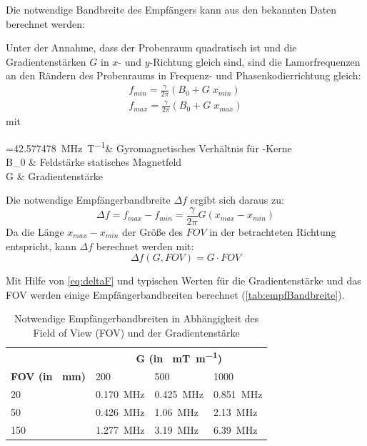 Die notwendige Bandbreite des Empfängers kann aus den bekannten Daten berechnet werden:

Unter der Annahme, dass der Probenraum quadratisch ist und die Gradientenstärken $G$ in $x$- und $y$-Richtung gleich sind, sind die Lamorfrequenzen an den Rändern des Probenraums in Frequenz- und Phasenkodierrichtung gleich:
\begin{subequations}
	\begin{align}
	f_{min}=\frac{\gamma}{2\pi} (B_0+G\; x_{min}) \\
	f_{max}=\frac{\gamma}{2\pi} (B_0+G\; x_{max})
	\end{align}
\end{subequations}
mit
\begin{with}
	\frac{\gamma}{2\pi} =\SI{42.577478}{\mega\hertz\per\tesla}& Gyromagnetisches Verhältnis für -Kerne \\
	B_0  & Feldstärke statisches Magnetfeld \\
	G  & Gradientenstärke \\
\end{with}

Die notwendige Empfängerbandbreite $\Delta f$ ergibt sich daraus zu:
\begin{equation}
\Delta f = f_{max}-f_{min} = \frac{\gamma}{2\pi} G (x_{max}-x_{min})
\end{equation}
Da die Länge $x_{max}-x_{min}$ der Größe des $FOV$ in der betrachteten Richtung entspricht, kann $\Delta f$ berechnet werden mit:
\begin{equation}
\label{eq:deltaF}
\Delta f(G, FOV) = G \cdot FOV
\end{equation}

Mit Hilfe von \autoref{eq:deltaF} und typischen Werten für die Gradientenstärke und das FOV werden einige Empfängerbandbreiten berechnet (\autoref{tab:empfBandbreite}).

\begin{table}[H]
	\centering
	\caption[Berechnung Empfängerbandbreite]{Notwendige Empfängerbandbreiten in Abhängigkeit des Field of View (FOV) und der Gradientenstärke}
	\label{tab:empfBandbreite}
	\begin{tabular}{llll}
		\toprule
		& \multicolumn{3}{c}{\textbf{G (in \SI{}{\milli\tesla\per\meter})}} \\ \cmidrule{2-4}
		\textbf{FOV (in \SI{}{\mm})}& 200 & 500 & 1000 \\
		20 & \SI{0.170}{\mega\hertz} & \SI{0.425}{\mega\hertz} & \SI{0.851}{\mega\hertz} \\
		50 & \SI{0.426}{\mega\hertz} & \SI{1.06}{\mega\hertz} & \SI{2.13}{\mega\hertz} \\
		150 & \SI{1.277}{\mega\hertz} & \SI{3.19}{\mega\hertz} & \SI{6.39}{\mega\hertz} \\
		\bottomrule
	\end{tabular}
\end{table}



